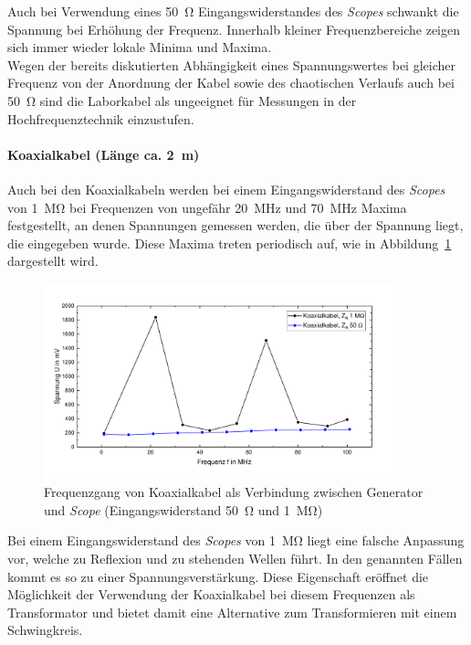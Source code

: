 \documentclass[a4paper,twoside,final]{article}
\begin{document}
Auch bei Verwendung eines \SI{50}{\ohm} Eingangswiderstandes des \textit{Scopes} schwankt die Spannung bei Erhöhung der Frequenz. Innerhalb kleiner Frequenzbereiche zeigen sich immer wieder lokale Minima und Maxima.\\
Wegen der bereits diskutierten Abhängigkeit eines Spannungswertes bei gleicher Frequenz von der Anordnung der Kabel sowie des chaotischen Verlaufs auch bei \SI{50}{\ohm} sind die Laborkabel als ungeeignet für Messungen in der Hochfrequenztechnik einzustufen.

\paragraph{Koaxialkabel (Länge ca. \SI{2}{\metre})}
Auch bei den Koaxialkabeln werden bei einem Eingangswiderstand des \textit{Scopes} von \SI{1}{\mega\ohm} bei Frequenzen von ungefähr \SI{20}{\mega\hertz} und \SI{70}{\mega\hertz} Maxima festgestellt, an denen Spannungen gemessen werden, die über der Spannung liegt, die eingegeben wurde. Diese Maxima treten periodisch auf, wie in Abbildung~\ref{fig:Frequenzverlauf_Koaxialkabel} dargestellt wird.
\begin{figure}[htp]
    \centering
    \vspace{-0.5cm}
        \includegraphics[width=0.9\textwidth]{Bilder/Koaxialkabel_50_1MOhm.pdf}
        \vspace{-0.25cm}
    \caption{Frequenzgang von Koaxialkabel als Verbindung zwischen Generator und \textit{Scope} (Eingangswiderstand \SI{50}{\ohm} und \SI{1}{\mega\ohm})}
    \label{fig:Frequenzverlauf_Koaxialkabel}
\end{figure}
Bei einem Eingangswiderstand des \textit{Scopes} von \SI{1}{\mega\ohm} liegt eine falsche Anpassung vor, welche zu Reflexion und zu stehenden Wellen führt. In den genannten Fällen kommt es so zu einer Spannungsverstärkung. Diese Eigenschaft eröffnet die Möglichkeit der Verwendung der Koaxialkabel bei diesem Frequenzen als Transformator und bietet damit eine Alternative zum Transformieren mit einem Schwingkreis.
\end{document}
